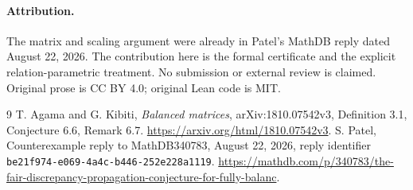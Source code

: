 \documentclass[11pt]{article}
\begin{document}
\paragraph{Attribution.}
The matrix and scaling argument were already in Patel's MathDB reply dated
August 22, 2026. The contribution here is the formal certificate and the
explicit relation-parametric treatment. No submission or external review is
claimed. Original prose is CC BY 4.0; original Lean code is MIT.
\begin{thebibliography}{9}
 T. Agama and G. Kibiti,
\emph{Balanced matrices}, arXiv:1810.07542v3, Definition 3.1,
Conjecture 6.6, Remark 6.7.
\url{https://arxiv.org/html/1810.07542v3}.
 S. Patel, Counterexample reply to MathDB340783,
August 22, 2026, reply identifier
\texttt{be21f974-e069-4a4c-b446-252e228a1119}.
\url{https://mathdb.com/p/340783/the-fair-discrepancy-propagation-conjecture-for-fully-balanc}.
\end{thebibliography}
\end{document}
